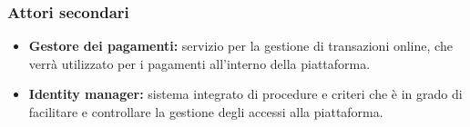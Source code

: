 \subsubsection{Attori secondari}
\begin{itemize}
\item \textbf{Gestore dei pagamenti:} servizio per la gestione di transazioni online, che verrà utilizzato per i pagamenti all'interno della piattaforma.%
\item \textbf{Identity manager:} sistema integrato di procedure e criteri che è in grado di facilitare e controllare la gestione degli accessi alla piattaforma. 
\end{itemize}